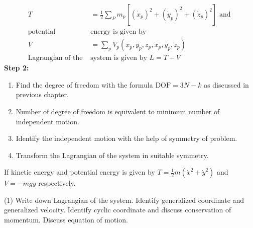 \begin{align*}
T&=\frac{1}{2} \sum_{P} m_{p}\left[\left(\dot{x}_{p}\right)^{2}+\left(\dot{y}_{p}\right)^{2}+\left(\dot{z}_{p}\right)^{2}\right] \text { and }\\
\text{potential }&\text{energy is given by}\\
V&=\sum_{p} V_{p}\left(x_{p}, y_{p}, z_{p}, \dot{x}_{p}, \dot{y}_{p}, \dot{z}_{p}\right)\\
\text{Lagrangian of the  }&\text{system is given by }L=T-V
\end{align*}
\textbf{Step 2:}
\begin{enumerate}[label=(\alph*)]
\item Find the degree of freedom with the formula $\mathrm{DOF}=3 N-k$ as discussed in previous chapter.
\item Number of degree of freedom is equivalent to minimum number of independent motion.
\item Identify the independent motion with the help of symmetry of problem.
\item Transform the Lagrangian of the system in suitable symmetry.
\end{enumerate}
\begin{exercise}
If kinetic energy and potential energy is given by $T=\frac{1}{2} m\left(\dot{x}^{2}+\dot{y}^{2}\right)$ and $V=-m g y$ respectively.
	 \begin{tasks}(1)
		\task[\textbf{a.}] Write down Lagrangian of the system.
		\task[\textbf{b.}] Identify generalized coordinate and generalized velocity.
		\task[\textbf{c.}] Identify cyclic coordinate and discuss conservation of momentum.
		\task[\textbf{d.}]  Discuss equation of motion.
	\end{tasks}
\end{exercise}
